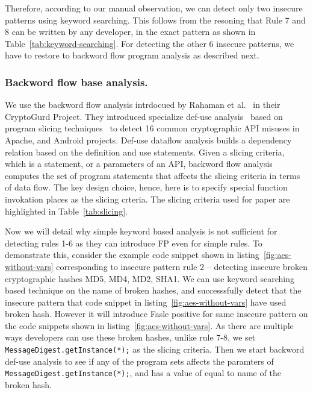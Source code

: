 Therefore, according to our manual observation, we can detect only two insecure patterns using keyword searching. This follows from the resoning 
that Rule 7 and 8 can be written by any developer, in the exact pattern as shown in Table~\ref{tab:keyword-searching}. For detecting the other 6 
insecure patterns, we have to restore to backword flow program analysis as described next.  

\subsubsection{Backword flow base analysis.}
We use the backword flow analysis intrdocued by Rahaman et al.~\cite{cryptogurd} in their CryptoGurd Project. They introduced specialize def-use analysis~\cite{use-def} based on program slicing techniques~\cite{program-slicing} to detect 16 common cryptographic API misuses in Apache, and Android projects. Def-use  dataflow analysis builds a dependency relation based on the definition and use statements. Given a slicing criteria, which is a statement, or a parameters of an API, backword flow analysis computes the set of program statements that affects the slicing criteria in terms of data flow. The key design choice, hence, here is to specify special function invokation places as the slicing crteria. The slicing criteria used for paper are highlighted in Table~\ref{tab:slicing}. 

Now we will detail why simple keyword based analysis is not sufficient for detecting rules 1-6 as they can introduce FP even for simple rules. 
To demonstrate this, consider the example code snippet shown in listing~\ref{fig:aes-without-vars} corresponding to insecure pattern rule 2 -- 
detecting insecure broken cryptographic hashes MD5, MD4, MD2, SHA1. We can use keyword searching based technique on the name of broken hashes, 
and successsfully detect that the insecure pattern that code snippet in listing~\ref{fig:aes-without-vars} have used broken hash. However it will 
introduce Fasle positive for same insecure pattern on the code snippets shown in listing~\ref{fig:aes-without-vars}.%
As there are multiple ways developers can use these broken hashes, unlike rule 7-8, we set \texttt{MessageDigest.getInstance(*);} as the slicing criteria. 
Then we start backword def-use analysis to see if any of the program sets affects the paramters of \texttt{MessageDigest.getInstance(*);}, 
and has a value of equal to name of the broken hash.


